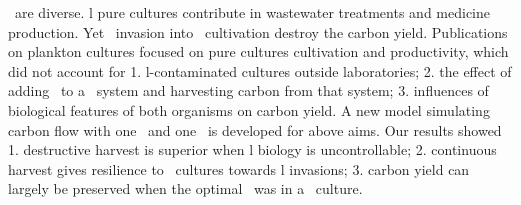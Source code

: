 \documentclass[../thesis.tex]{subfiles} %
\begin{document}
\Bac\ are diverse.  \Bac l pure cultures contribute in wastewater treatments and medicine production.  Yet \bac\ invasion into \phy\ cultivation destroy the carbon yield.  Publications on plankton cultures focused on pure cultures cultivation and productivity, which did not account for 1. \bac l-contaminated cultures outside laboratories; 2. the effect of adding \bac\ to a \phy\ system and harvesting carbon from that system; 3. influences of biological features of both organisms on carbon yield.  A new model simulating carbon flow with one \phy\ and one \bac\ is developed for above aims.  Our results showed 1. destructive harvest is superior when \bac l biology is uncontrollable; 2. continuous harvest gives resilience to \phy\ cultures towards \bac l invasions; 3. carbon yield can largely be preserved when the optimal \bac\ was in a \phy\ culture.
\end{document}
